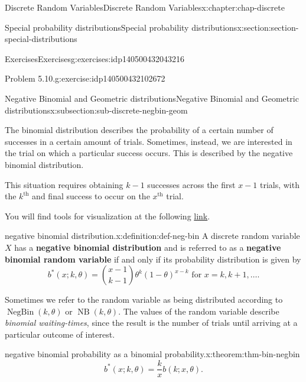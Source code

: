 \documentclass[oneside,10pt,]{book}
\newcommand{\terminology}[1]{\textbf{#1}}
\begin{document}
\begin{chapterptx}{Discrete Random Variables}{}{Discrete Random Variables}{}{}{x:chapter:chap-discrete}
\begin{sectionptx}{Special probability distributions}{}{Special probability distributions}{}{}{x:section:section-special-distributions}
\begin{exercises-subsection}{Exercises}{}{Exercises}{}{}{g:exercises:idp140500432043216}
\begin{divisionexercise}{2}{Problem 5.10.}{}{g:exercise:idp140500432102672}
\end{divisionexercise}%
\end{exercises-subsection}
%
%
\typeout{************************************************}
\typeout{************************************************}
%
\begin{subsectionptx}{Negative Binomial and Geometric distributions}{}{Negative Binomial and Geometric distributions}{}{}{x:subsection:sub-discrete-negbin-geom}
\begin{introduction}{}%
The binomial distribution describes the probability of a certain number of successes in a certain amount of trials. Sometimes, instead, we are interested in the trial on which a particular success occurs.  This is described by the negative binomial distribution.%
\par
This situation requires obtaining \(k-1\) successes across the first \(x-1\) trials, with the \(k^{\text{th}}\) and final success to occur on the \(x^{\text{th}}\) trial.%
\par
You will find tools for visualization at the following \href{https://buddy.uco.edu/shiny/slaverty/mathstat/NegBin/}{link}.%
\end{introduction}%
\begin{definition}{negative binomial distribution.}{x:definition:def-neg-bin}%
A discrete random variable \(\displaystyle X\) has a \terminology{negative binomial distribution} and is referred to as a \terminology{negative binomial random variable} if and only if its probability distribution is given by%
\begin{equation*}
b^*(x; k, \theta) = {x-1\choose
k-1}\theta^k(1-\theta)^{x-k} \text{ for }x = k, k+1, \dots\text{.}
\end{equation*}
%
\end{definition}
Sometimes we refer to the random variable as being distributed according to \(\operatorname{NegBin}(k, \theta)\) or \(\operatorname{NB}(k, \theta)\).   The values of the random variable describe \emph{binomial waiting-times}, since the result is the number of trials until arriving at a particular outcome of interest.%
\begin{theorem}{negative binomial probability as a binomial probability.}{}{x:theorem:thm-bin-negbin}%
%
\begin{equation*}
b^*(x; k, \theta) = \frac{k}{x}b(k; x, \theta)\text{.}
\end{equation*}
%
\end{theorem}

\end{subsectionptx}
\end{sectionptx}
\end{chapterptx}
\end{document}
